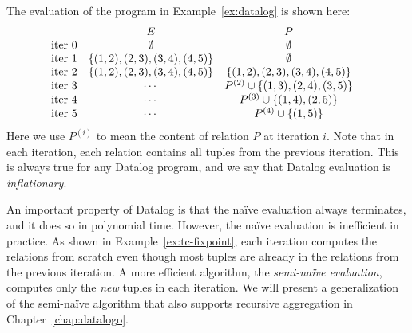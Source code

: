 \begin{ex}
\label{ex:tc-fixpoint}
The evaluation of the program in Example~\ref{ex:datalog} is shown here:
%
\begin{align*}
    &
    \begin{array}{l c c } 
                       & E & P \\ 
        \text{iter } 0 & \emptyset & \emptyset \\ 
        \text{iter } 1 & \{(1, 2), (2, 3), (3, 4), (4, 5)\} & \emptyset \\ 
        \text{iter } 2 & \{(1, 2), (2, 3), (3, 4), (4, 5)\} & \{(1, 2), (2, 3), (3, 4), (4, 5)\} \\ 
        \text{iter } 3 & \cdots & P^{(2)} \cup \{ (1, 3), (2, 4), (3, 5)\} \\
        \text{iter } 4 & \cdots & P^{(3)} \cup \{ (1, 4), (2, 5) \} \\
        \text{iter } 5 & \cdots & P^{(4)} \cup \{ (1, 5) \} \\
    \end{array}
\end{align*}
%
Here we use $P^{(i)}$ to mean the content of relation $P$ at iteration $i$.
Note that in each iteration, each relation contains all tuples from the previous iteration.
This is always true for any Datalog program, 
 and we say that Datalog evaluation is {\em inflationary}.
\end{ex}


An important property of Datalog is that the na\"ive evaluation 
 always terminates, and it does so in polynomial time.
However, the na\"ive evaluation is inefficient in practice.
As shown in Example~\ref{ex:tc-fixpoint},
 each iteration computes the relations from scratch 
 even though most tuples are already in the relations from the previous iteration.
A more efficient algorithm, the {\em semi-na\"ive evaluation},
 computes only the {\em new} tuples in each iteration.
We will present a generalization of the semi-na\"ive algorithm 
 that also supports recursive aggregation in Chapter~\ref{chap:datalogo}.
